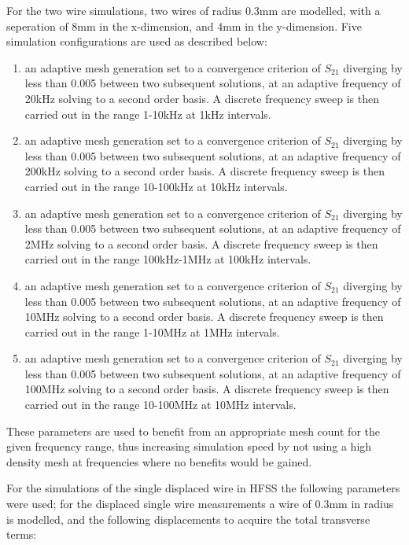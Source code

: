 For the two wire simulations, two wires of radius 0.3mm are modelled, with a seperation of 8mm in the x-dimension, and 4mm in the y-dimension. Five simulation configurations are used as described below:

\begin{enumerate}
\item{an adaptive mesh generation set to a convergence criterion of $S_{21}$ diverging by less than 0.005 between two subsequent solutions, at an adaptive frequency of 20kHz solving to a second order basis. A discrete frequency sweep is then carried out in the range 1-10kHz at 1kHz intervals.}
\item{an adaptive mesh generation set to a convergence criterion of $S_{21}$ diverging by less than 0.005 between two subsequent solutions, at an adaptive frequency of 200kHz solving to a second order basis. A discrete frequency sweep is then carried out in the range 10-100kHz at 10kHz intervals.}
\item{an adaptive mesh generation set to a convergence criterion of $S_{21}$ diverging by less than 0.005 between two subsequent solutions, at an adaptive frequency of 2MHz solving to a second order basis. A discrete frequency sweep is then carried out in the range 100kHz-1MHz at 100kHz intervals.}
\item{an adaptive mesh generation set to a convergence criterion of $S_{21}$ diverging by less than 0.005 between two subsequent solutions, at an adaptive frequency of 10MHz solving to a second order basis. A discrete frequency sweep is then carried out in the range 1-10MHz at 1MHz intervals.}
\item{an adaptive mesh generation set to a convergence criterion of $S_{21}$ diverging by less than 0.005 between two subsequent solutions, at an adaptive frequency of 100MHz solving to a second order basis. A discrete frequency sweep is then carried out in the range 10-100MHz at 10MHz intervals.}
\end{enumerate}

These parameters are used to benefit from an appropriate mesh count for the given frequency range, thus increasing simulation speed by not using a high density mesh at frequencies where no benefits would be gained.

For the simulations of the single displaced wire in HFSS the following parameters were used; for the displaced single wire measurements a wire of 0.3mm in radius is modelled, and the following displacements to acquire the total transverse terms:

